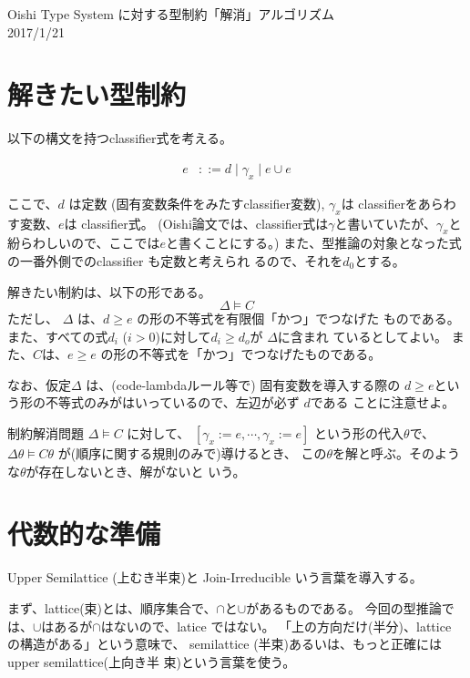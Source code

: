 \documentclass[dvipdfmx]{jsarticle}
\begin{document}
\begin{center}
  Oishi Type System に対する型制約「解消」アルゴリズム  \\
  2017/1/21
\end{center}

\section{解きたい型制約}

以下の構文を持つclassifier式を考える。

\begin{align*}
  e & ::= d \mid \gamma_x \mid e \cup e
\end{align*}

ここで、$d$ は定数 (固有変数条件をみたすclassifier変数), $\gamma_x$は
classifierをあらわす変数、$e$は classifier式。
(Oishi論文では、classifier式は$\gamma$と書いていたが、$\gamma_x$と
紛らわしいので、ここでは$e$と書くことにする。)
また、型推論の対象となった式の一番外側でのclassifier も定数と考えられ
るので、それを$d_0$とする。

解きたい制約は、以下の形である。
\[
  \Delta \models C
\]
ただし、 $\Delta$ は、$d \ge e$ の形の不等式を有限個「かつ」でつなげた
ものである。
また、すべての式$d_i$ ($i>0$)に対して$d_i \ge d_o$が $\Delta$に含まれ
ているとしてよい。
また、$C$は、$e \ge e$ の形の不等式を「かつ」でつなげたものである。

なお、仮定$\Delta$ は、(code-lambdaルール等で) 固有変数を導入する際の
$d \ge e$という形の不等式のみがはいっているので、左辺が必ず $d$である
ことに注意せよ。


制約解消問題 $ \Delta \models C $ に対して、
$[\gamma_x := e,\cdots,\gamma_x:=e]$ という形の代入$\theta$で、
$ \Delta\theta \models C\theta $ が(順序に関する規則のみで)導けるとき、
この$\theta$を解と呼ぶ。そのような$\theta$が存在しないとき、解がないと
いう。

\section{代数的な準備}

Upper Semilattice (上むき半束)と Join-Irreducible いう言葉を導入する。

まず、lattice(束)とは、順序集合で、$\cap$と$\cup$があるものである。
今回の型推論では、$\cup$はあるが$\cap$はないので、latice ではない。
「上の方向だけ(半分)、lattice の構造がある」という意味で、
semilattice (半束)あるいは、もっと正確には upper semilattice(上向き半
束)という言葉を使う。
\end{document}
